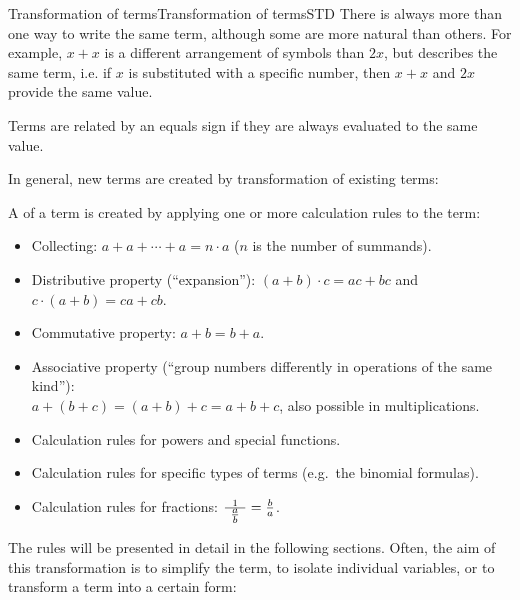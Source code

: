 \begin{MXContent}{Transformation of terms}{Transformation of terms}{STD}
There is always more than one way to write the same term, although some are more natural than others. For example, $x+x$ is a different 
arrangement of symbols than $2x$, but describes the same term, i.e. if $x$ is substituted with a specific number, then 
$x+x$ and $2x$ provide the same value.

\begin{MInfo}
Terms are related by an equals sign if they are always evaluated to the same value.
\end{MInfo}

In general, new terms are created by transformation of existing terms:

\begin{MInfo}
A  of a term is created by applying one or more calculation 
rules to the term:

\begin{itemize}
\item{Collecting: $a+a+\cdots+a=n\cdot a$ ($n$ is the number of summands).}
\item{Distributive property  (``expansion''): $(a+b)\cdot c = a c+b c$ and $c\cdot(a+b)=c a+c b$.}
\item{Commutative property: $a+b=b+a$.}
\item{Associative property (``group numbers differently in operations of the same kind''): \\$a+(b+c)=(a+b)+c=a+b+c$, 
also possible in multiplications.}
\item{Calculation rules for powers and special functions.}
\item{Calculation rules for specific types of terms (e.g.\ the binomial formulas).}
\item{Calculation rules for fractions: $\tfrac{1}{\phantom{2}\tfrac{a}{b}\phantom{2}}=\tfrac{b}{a}$.}
\end{itemize}
\end{MInfo}

The rules will be presented in detail in the following sections. Often, the aim of this transformation is to 
simplify the term, to isolate individual variables, or to transform a term into a certain form:



\end{MXContent}
